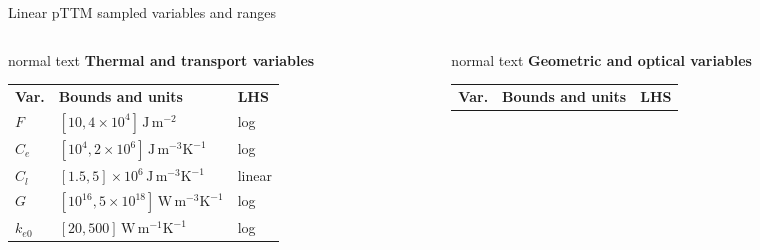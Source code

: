 \documentclass[aspectratio=169,10pt]{beamer}
\begin{document}
\begin{frame}[t]{Linear pTTM sampled variables and ranges}
  \hypertarget{supp:sampling-linear-ranges}{}
  \vspace{-0.18cm}\hfill
  \hspace{0.10cm}\GVBackupIndexButton
  \vspace{0.02cm}
  \begin{columns}[T,totalwidth=0.94\textwidth]
    \begin{column}{0.45\textwidth}
      \begin{beamercolorbox}[wd=\linewidth,sep=0.45em]{normal text}
        \small\textbf{\color{GVTeal}Thermal and transport variables}\par
        \vspace{0.07cm}
        \scriptsize\renewcommand{\arraystretch}{1.12}
        \begin{tabular}{@{}lll@{}}
          \rowcolor{GVTealTint}
          \textbf{Var.} & \textbf{Bounds and units} & \textbf{LHS} \\
          \(F\) & \([10,4\times10^4]\,\mathrm{J\,m^{-2}}\) & log \\
          \(C_e\) & \([10^4,2\times10^6]\,\mathrm{J\,m^{-3}K^{-1}}\) & log \\
          \(C_l\) & \([1.5,5]\times10^6\,\mathrm{J\,m^{-3}K^{-1}}\) & linear \\
          \(G\) & \([10^{16},5\times10^{18}]\,\mathrm{W\,m^{-3}K^{-1}}\) & log \\
          \(k_{e0}\) & \([20,500]\,\mathrm{W\,m^{-1}K^{-1}}\) & log \\
        \end{tabular}
      \end{beamercolorbox}
    \end{column}
    \begin{column}{0.45\textwidth}
      \begin{beamercolorbox}[wd=\linewidth,sep=0.45em]{normal text}
        \small\textbf{\color{GVCapacityPurple}Geometric and optical variables}\par
        \vspace{0.07cm}
        \scriptsize\renewcommand{\arraystretch}{1.12}
        \begin{tabular}{@{}lll@{}}
          \rowcolor{GVTealTint}
          \textbf{Var.} & \textbf{Bounds and units} & \textbf{LHS} \\

\end{tabular}
\end{beamercolorbox}
\end{column}
\end{columns}
\end{frame}
\end{document}
